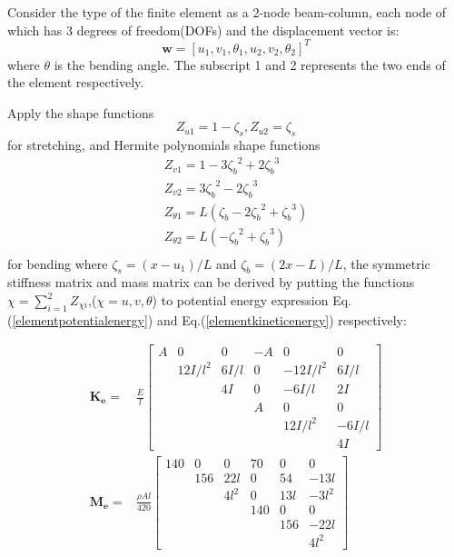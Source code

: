 \documentclass[conference, onecolumn]{IEEEtran}
\begin{document}
Consider the type of the finite element as a 2-node beam-column, each node of which has 3 degrees of freedom(DOFs) and the displacement vector is:
\begin{equation}
    {\boldsymbol{w}} = 
		[u_1,v_1,\theta_1,u_2,v_2,\theta_2]^T
	\label{quality}
\end{equation}
where $\theta$ is the bending angle. The subscript 1 and 2 represents the two ends of the element respectively.

Apply the shape functions 
\begin{equation}
	Z_{u1}=1-\zeta_s, Z_{u2}=\zeta_s
	\label{shapefunctionu}
\end{equation} 
for stretching, and Hermite polynomials shape functions
\begin{equation}	
	\begin{array}{l}
		Z_{v1}=1-3{\zeta_b}^2+2{\zeta_b}^3\\
		Z_{v2}=3{\zeta_b}^2-2{\zeta_b}^3\\
		Z_{\theta1}=L(\zeta_b-2{\zeta_b}^2+{\zeta_b}^3)\\
		Z_{\theta2}=L(-{\zeta_b}^2+{\zeta_b}^3)\\
	\end{array}
	\label{shapefunctionv}
\end{equation}
for bending where $\zeta_s = (x-u_1)/L$ and ${\zeta_b}=(2x-{L})/L $, the symmetric stiffness matrix and mass matrix can be derived by putting the functions $\chi =\sum_{i = 1}^{2}{Z_{\chi i}} $,($\chi=u,v,\theta$) to potential energy expression Eq.(\ref{elementpotentialenergy}) and Eq.(\ref{elementkineticenergy}) respectively:


\begin{subequations}
	\begin{align}
	\mathbf{K_e}=&\frac{E}{l}
	\begin{bmatrix}
		A & 0 & 0 & -A & 0 &0  \\
		& 12I/ \!l^2 & 6I/ \!l & 0 & -12I/ \!l^2 & 6I/ \!l \\
		& & 4I & 0 & -6I/ \!l & 2I \\
		& & & A & 0 & 0 \\
		& & & & 12I/ \!l^2 & -6I/ \!l\\
		& & & & & 4I		
	\end{bmatrix} \\ 
	\mathbf{M_e} =& \frac{\rho A l}{420}
	\begin{bmatrix}
		140 & 0 & 0 & 70 & 0 &0  \\
		& 156 & 22l & 0 & 54 & -13l \\
		& & 4l^2 & 0 & 13l & -3l^2 \\
		& & & 140 & 0 & 0 \\
		& & & & 156 & -22l\\
		& & & & & 4l^2		
	\end{bmatrix}
	\end{align}
\label{matrixofelement}
\end{subequations}
\end{document}

